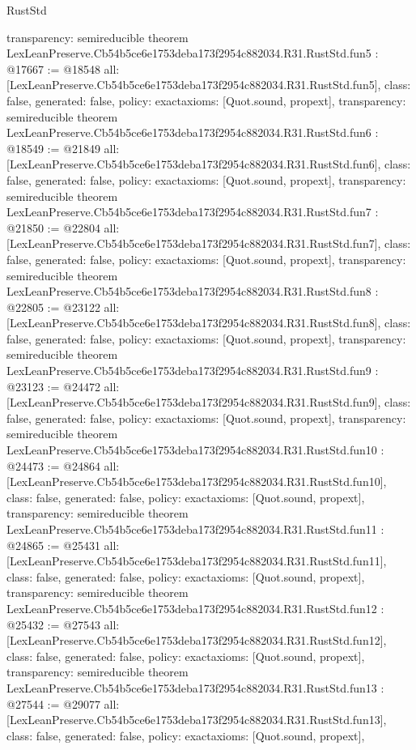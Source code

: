 \begin{lexlean}{RustStd}
\begin{coremodule}
{  transparency: semireducible
}
theorem LexLeanPreserve.Cb54b5ce6e1753deba173f2954c882034.R31.RustStd.fun5 : @17667 := @18548 {
  all: [LexLeanPreserve.Cb54b5ce6e1753deba173f2954c882034.R31.RustStd.fun5],
  class: false,
  generated: false,
  policy: exact{axioms: [Quot.sound, propext]},
  transparency: semireducible
}
theorem LexLeanPreserve.Cb54b5ce6e1753deba173f2954c882034.R31.RustStd.fun6 : @18549 := @21849 {
  all: [LexLeanPreserve.Cb54b5ce6e1753deba173f2954c882034.R31.RustStd.fun6],
  class: false,
  generated: false,
  policy: exact{axioms: [Quot.sound, propext]},
  transparency: semireducible
}
theorem LexLeanPreserve.Cb54b5ce6e1753deba173f2954c882034.R31.RustStd.fun7 : @21850 := @22804 {
  all: [LexLeanPreserve.Cb54b5ce6e1753deba173f2954c882034.R31.RustStd.fun7],
  class: false,
  generated: false,
  policy: exact{axioms: [Quot.sound, propext]},
  transparency: semireducible
}
theorem LexLeanPreserve.Cb54b5ce6e1753deba173f2954c882034.R31.RustStd.fun8 : @22805 := @23122 {
  all: [LexLeanPreserve.Cb54b5ce6e1753deba173f2954c882034.R31.RustStd.fun8],
  class: false,
  generated: false,
  policy: exact{axioms: [Quot.sound, propext]},
  transparency: semireducible
}
theorem LexLeanPreserve.Cb54b5ce6e1753deba173f2954c882034.R31.RustStd.fun9 : @23123 := @24472 {
  all: [LexLeanPreserve.Cb54b5ce6e1753deba173f2954c882034.R31.RustStd.fun9],
  class: false,
  generated: false,
  policy: exact{axioms: [Quot.sound, propext]},
  transparency: semireducible
}
theorem LexLeanPreserve.Cb54b5ce6e1753deba173f2954c882034.R31.RustStd.fun10 : @24473 := @24864 {
  all: [LexLeanPreserve.Cb54b5ce6e1753deba173f2954c882034.R31.RustStd.fun10],
  class: false,
  generated: false,
  policy: exact{axioms: [Quot.sound, propext]},
  transparency: semireducible
}
theorem LexLeanPreserve.Cb54b5ce6e1753deba173f2954c882034.R31.RustStd.fun11 : @24865 := @25431 {
  all: [LexLeanPreserve.Cb54b5ce6e1753deba173f2954c882034.R31.RustStd.fun11],
  class: false,
  generated: false,
  policy: exact{axioms: [Quot.sound, propext]},
  transparency: semireducible
}
theorem LexLeanPreserve.Cb54b5ce6e1753deba173f2954c882034.R31.RustStd.fun12 : @25432 := @27543 {
  all: [LexLeanPreserve.Cb54b5ce6e1753deba173f2954c882034.R31.RustStd.fun12],
  class: false,
  generated: false,
  policy: exact{axioms: [Quot.sound, propext]},
  transparency: semireducible
}
theorem LexLeanPreserve.Cb54b5ce6e1753deba173f2954c882034.R31.RustStd.fun13 : @27544 := @29077 {
  all: [LexLeanPreserve.Cb54b5ce6e1753deba173f2954c882034.R31.RustStd.fun13],
  class: false,
  generated: false,
  policy: exact{axioms: [Quot.sound, propext]},
}
\end{coremodule}
\end{lexlean}
